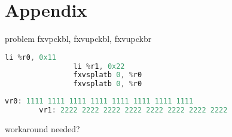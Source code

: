 \documentclass[10pt]{beamer}
\begin{document}
\section{Appendix}

\begin{frame}[fragile]{problem fxvpckbl, fxvupckbl, fxvupckbr}{}
			\begin{lstlisting}[language=C++,basicstyle=\ttfamily\scriptsize,keywordstyle=\color{red}]
				li %r0, 0x11
				li %r1, 0x22
				fxvsplatb 0, %r0
				fxvsplatb 0, %r0
			\end{lstlisting} 
      		\begin{lstlisting}[language=C++,basicstyle=\fontsize{5}{7}\selectfont\ttfamily,keywordstyle=\color{red}]
      		vr0: 1111 1111 1111 1111 1111 1111 1111 1111
		vr1: 2222 2222 2222 2222 2222 2222 2222 2222
		\end{lstlisting}
			workaround needed?
\end{frame}
\end{document}

